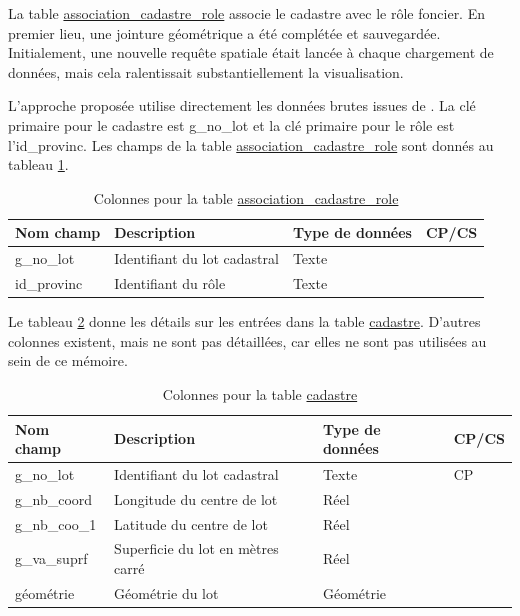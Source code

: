         La table \underline{association\_cadastre\_role} associe le cadastre avec le rôle foncier. En premier lieu, une jointure géométrique a été complétée et sauvegardée. Initialement, une nouvelle requête spatiale était lancée à chaque chargement de données, mais cela ralentissait substantiellement la visualisation. \par
        L'approche proposée utilise directement les données brutes issues de \textcite{gouvernement_du_quebec_manuel_2024}. La clé primaire pour le cadastre est g\_no\_lot et la clé primaire pour le rôle est l'id\_provinc. Les champs de la table \underline{association\_cadastre\_role} sont donnés au tableau \ref{tab:definition_assoc_role_cadastre}.
        \begin{table}[ht]
            \caption{Colonnes pour la table \underline{association\_cadastre\_role}}
            \label{tab:definition_assoc_role_cadastre}
            \centering
            \begin{tabular}{m{}|m{}m{}m{}}
                \hline
                Nom champ & Description & Type de données & CP/CS  \\
                \hline
                g\_no\_lot & Identifiant du lot cadastral & Texte & \\
                id\_provinc & Identifiant du rôle & Texte & \\
                \hline
           \end{tabular}
           
        \end{table}   
        \par
        Le tableau \ref{tab:definition_cadastre} donne les détails sur les entrées dans la table \underline{cadastre}. D'autres colonnes existent, mais ne sont pas détaillées, car elles ne sont pas utilisées au sein de ce mémoire.\par
        \begin{table}[!ht]
            \caption{Colonnes pour la table \underline{cadastre}}
            \label{tab:definition_cadastre}
            \centering
            \begin{tabular}{m{}|m{}m{}m{}}
                \hline
                Nom champ       & Description                   & Type de données   & CP/CS  \\
                \hline
                g\_no\_lot      & Identifiant du lot cadastral  & Texte             & CP\\
                g\_nb\_coord    & Longitude du centre de lot    & Réel              & \\
                g\_nb\_coo\_1   & Latitude du centre de lot     & Réel              & \\
                g\_va\_suprf    & Superficie du lot en mètres carré & Réel              & \\
                géométrie        & Géométrie du lot              & Géométrie         & \\
                \hline
           \end{tabular}
           
        \end{table}   
